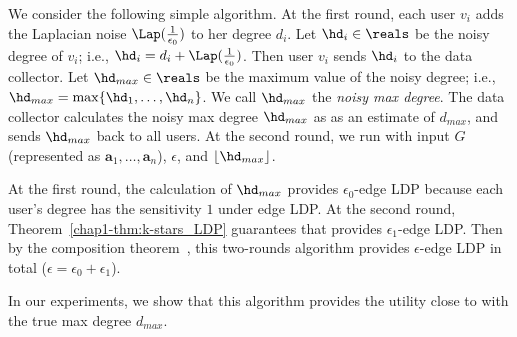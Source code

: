 We consider the following simple algorithm. 
At the first round, 
each user $v_i$ adds the Laplacian noise $\Lap(\frac{1}{\epsilon_0})$ to her degree $d_i$. 
Let $\hd_i \in \reals$ be the noisy degree of $v_i$; i.e., $\hd_i = d_i + \Lap(\frac{1}{\epsilon_0})$. 
Then user $v_i$ sends $\hd_i$ to the data collector. 
Let $\hd_{max} \in \reals$ be the maximum value of the noisy degree; i.e., $\hd_{max} = \max\{\hd_1, \ldots, \hd_n\}$. 
We call $\hd_{max}$ the \textit{noisy max degree}. 
The data collector calculates the noisy max degree $\hd_{max}$ as 
as an estimate of $d_{max}$, 
and sends $\hd_{max}$ back to all users. 
At the second round, we run  
with input $G$ (represented as $\textbf{a}_1, \ldots, \textbf{a}_n$), $\epsilon$, and $\lfloor \hd_{max} \rfloor$.


At the first round, the calculation of $\hd_{max}$  provides $\epsilon_0$-edge LDP because each user's degree has the sensitivity $1$ under edge LDP. 
At the second round, Theorem~\ref{chap1-thm:k-stars_LDP} guarantees that 
 provides $\epsilon_1$-edge LDP. 
Then by the composition theorem~\cite{DP}, this two-rounds algorithm provides $\epsilon$-edge LDP in total ($\epsilon =\epsilon_0 + \epsilon_1$). 

In our experiments, we show that this algorithm provides the utility close to  with the true max degree $d_{max}$. 

